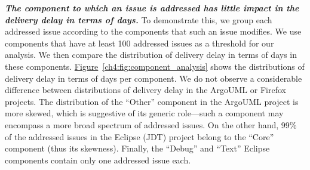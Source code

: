 \noindent\textbf{\textit{The component to which an issue is addressed has little
impact in the delivery delay in terms of days.}} To demonstrate this, we group
each addressed issue according to the components that such an issue modifies. We use
components that have at least 100 addressed issues as a threshold for our analysis.
We then compare the distribution of delivery delay in terms of days in these
components.
\hyperref[ch4:fig:component_analysis]{Figure}~\ref{ch4:fig:component_analysis} shows the
distributions of delivery delay in terms of days per component. We do not
observe a considerable difference between distributions of delivery delay in
the ArgoUML or Firefox projects. The distribution of the ``Other'' component in
the ArgoUML project is more skewed, which is suggestive of its generic
role---such a component may encompass a more broad spectrum of addressed issues. On
the other hand, 99\% of the addressed issues in the Eclipse (JDT) project belong to
the ``Core'' component (thus its skewness). Finally, the ``Debug'' and ``Text''
Eclipse components contain only one addressed issue each.   


